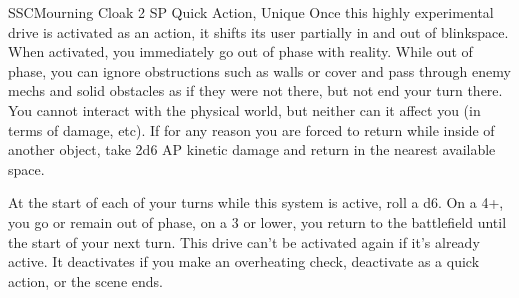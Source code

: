 \begin{mech}{SSC}{Mourning Cloak}
2 SP
Quick Action, Unique
Once this highly experimental drive is activated as an action, it shifts its user partially in and out of blinkspace. When activated, you immediately go out of phase with reality. While out of phase, you can ignore obstructions such as walls or cover and pass through enemy mechs and solid obstacles as if they were not there, but not end your turn there. You cannot interact with the physical world, but neither can it affect you (in terms of damage, etc). If for any reason you are forced to return while inside of another object, take 2d6 AP kinetic damage and return in the nearest available space.


At the start of each of your turns while this system is active, roll a d6. On a 4+, you go or remain out of phase, on a 3 or lower, you return to the battlefield until the start of your next turn. This drive can't be activated again if it's already active. It deactivates if you make an overheating check, deactivate as a quick action, or the scene ends.
\end{mech}